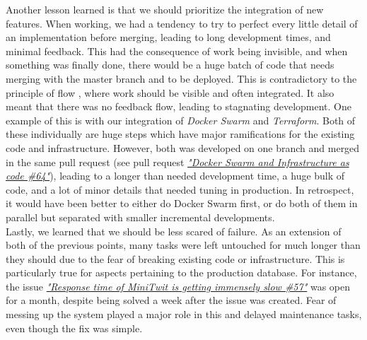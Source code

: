 \documentclass[11pt]{article}
\begin{document}
Another lesson learned is that we should prioritize the integration of new features. When working, we had a tendency to try to perfect every little detail of an implementation before merging, leading to long development times, and minimal feedback. This had the consequence of work being invisible, and when something was finally done, there would be a huge batch of code that needs merging with the master branch and to be deployed. This is contradictory to the principle of flow \citep{devops_handbook}, where work should be visible and often integrated. It also meant that there was no feedback flow, leading to stagnating development. One example of this is with our integration of \textit{Docker Swarm} and \textit{Terraform}. Both of these individually are huge steps which have major ramifications for the existing code and infrastructure. However, both was developed on one branch and merged in the same pull request (see pull request \href{https://github.com/group-o-minitwit-2024/MiniTwit/pull/64}{\textit{"Docker Swarm and Infrastructure as code \#64"}}), leading to a longer than needed development time, a huge bulk of code, and a lot of minor details that needed tuning in production. In retrospect, it would have been better to either do Docker Swarm first, or do both of them in parallel but separated with smaller incremental developments. \\


Lastly, we learned that we should be less scared of failure. As an extension of both of the previous points, many tasks were left untouched for much longer than they should due to the fear of breaking existing code or infrastructure. This is particularly true for aspects pertaining to the production database. For instance, the issue \href{https://github.com/group-o-minitwit-2024/MiniTwit/issues/57}{\textit{"Response time of MiniTwit is getting immensely slow \#57"}} was open for a month, despite being solved a week after the issue was created. Fear of messing up the system played a major role in this and delayed maintenance tasks, even though the fix was simple.


\end{document}
